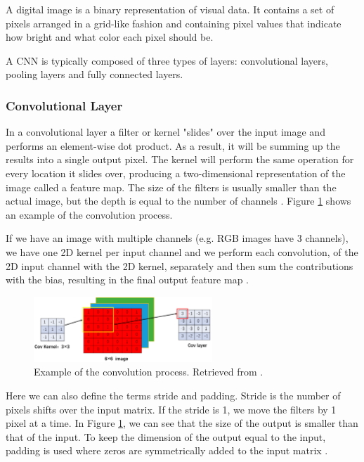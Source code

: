 A digital image is a binary representation of visual data. It contains a set of pixels arranged in a grid-like fashion and containing pixel values that indicate how bright and what color each pixel should be. 

A CNN is typically composed of three types of layers: convolutional layers, pooling layers and fully connected layers. 

\subsubsection*{Convolutional Layer}

In a convolutional layer a filter or kernel "slides" over the input image and performs an element-wise dot product. As a result, it will be summing up the results into a single output pixel. The kernel will perform the same operation for every location it slides over, producing a two-dimensional representation of the image called a feature map. The size of the filters is usually smaller than the actual image, but the depth is equal to the number of channels \cite{2018guide}. Figure \ref{fig:convlayer} shows an example of the convolution process.

If we have an image with multiple channels (e.g. RGB images have 3 channels), we have one \ac{2D} kernel per input channel and we perform each convolution, of the \ac{2D} input channel with the \ac{2D} kernel, separately and then sum the contributions with the bias, resulting in the final output feature map \cite{2018guide}.

\begin{figure}[!htb]
  \centering
  \includegraphics[width=0.60\textwidth]{Images/convlayer.jpg}
  \caption[Example of the convolution process.]{Example of the convolution process. Retrieved from \cite{review:DL}.}
  \label{fig:convlayer}
\end{figure}

Here we can also define the terms stride and padding. Stride is the number of pixels shifts over the input matrix. If the stride is 1, we move the filters by 1 pixel at a time. In Figure \ref{fig:convlayer}, we can see that the size of the output is smaller than that of the input. To keep the dimension of the output equal to the input, padding is used where zeros are symmetrically added to the input matrix \cite{guide:cnn}.


